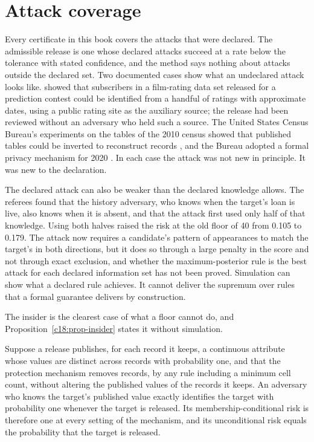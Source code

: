\section{Attack coverage}

Every certificate in this book covers the attacks that were declared. The admissible
release is one whose declared attacks succeed at a rate below the tolerance with stated
confidence, and the method says nothing about attacks outside the declared set. Two
documented cases show what an undeclared attack looks like. \citet{narayanan2008}
showed that subscribers in a film-rating data set released for a prediction contest
could be identified from a handful of ratings with approximate dates, using a public
rating site as the auxiliary source; the release had been reviewed without an
adversary who held such a source. The United States Census Bureau's experiments on
the tables of the 2010 census showed that published tables could be inverted to
reconstruct records \citep{garfinkel2019}, and the Bureau adopted a formal privacy
mechanism for 2020 \citep{abowd2022}. In each case the attack was not new in
principle. It was new to the declaration.

The declared attack can also be weaker than the declared knowledge allows. The
referees found that the history adversary, who knows when the target's loan is live,
also knows when it is absent, and that the attack first used only half of that
knowledge. Using both halves raised the risk at the old floor of 40 from 0.105 to
0.179. %
The attack now requires a candidate's pattern of appearances to match the target's in
both directions, but it does so through a large penalty in the score and not through
exact exclusion, and whether the maximum-posterior rule is the best attack for each
declared information set has not been proved. %
Simulation can show what a declared rule achieves. It cannot deliver the supremum over
rules that a formal guarantee delivers by construction.

The insider is the clearest case of what a floor cannot do, and
Proposition~\ref{c18:prop-insider} states it without simulation.

\begin{proposition}\label{c18:prop-insider}
Suppose a release publishes, for each record it keeps, a continuous attribute whose
values are distinct across records with probability one, and that the protection
mechanism removes records, by any rule including a minimum cell count, without
altering the published values of the records it keeps. An adversary who knows the
target's published value exactly identifies the target with probability one whenever
the target is released. Its membership-conditional risk is therefore one at every
setting of the mechanism, and its unconditional risk equals the probability that the
target is released.
\end{proposition}

